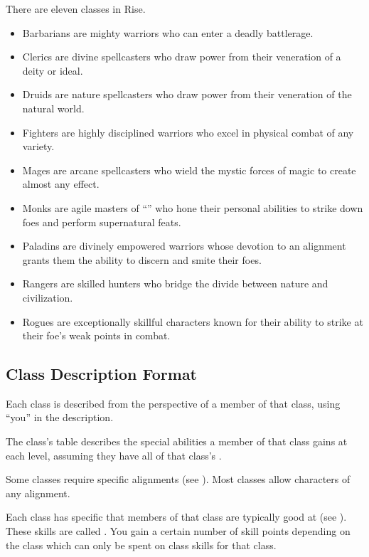     There are eleven classes in Rise.
    \begin{itemize}
        \item Barbarians are mighty warriors who can enter a deadly battlerage.
        \item Clerics are divine spellcasters who draw power from their veneration of a deity or ideal.
        \item Druids are nature spellcasters who draw power from their veneration of the natural world.
        \item Fighters are highly disciplined warriors who excel in physical combat of any variety.
        \item Mages are arcane spellcasters who wield the mystic forces of magic to create almost any effect.
        \item Monks are agile masters of ``\ki'' who hone their personal abilities to strike down foes and perform supernatural feats.
        \item Paladins are divinely empowered warriors whose devotion to an alignment grants them the ability to discern and smite their foes.
        \item Rangers are skilled hunters who bridge the divide between nature and civilization.
        \item Rogues are exceptionally skillful characters known for their ability to strike at their foe's weak points in combat.
    \end{itemize}

    \subsection{Class Description Format}
        Each class is described from the perspective of a member of that class, using ``you'' in the description.

        The class's table describes the special abilities a member of that class gains at each level, assuming they have all of that class's .

        Some classes require specific alignments (see ).
        Most classes allow characters of any alignment.

        Each class has specific  that members of that class are typically good at (see ).
        These skills are called .
        You gain a certain number of skill points depending on the class which can only be spent on class skills for that class.

